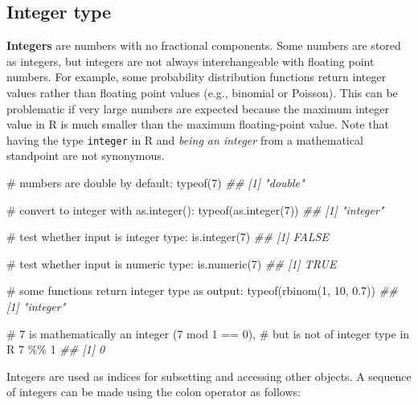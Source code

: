 \documentclass[
  13,
  letterpaper,
]{report}
\newenvironment{Shaded}{\begin{snugshade}}{\end{snugshade}}
\newcommand{\CommentTok}[1]{\textcolor[rgb]{0.37,0.37,0.37}{#1}}
\newcommand{\DecValTok}[1]{\textcolor[rgb]{0.68,0.00,0.00}{#1}}
\newcommand{\DocumentationTok}[1]{\textcolor[rgb]{0.37,0.37,0.37}{\textit{#1}}}
\newcommand{\FloatTok}[1]{\textcolor[rgb]{0.68,0.00,0.00}{#1}}
\newcommand{\FunctionTok}[1]{\textcolor[rgb]{0.28,0.35,0.67}{#1}}
\newcommand{\NormalTok}[1]{\textcolor[rgb]{0.00,0.23,0.31}{#1}}
\newcommand{\SpecialCharTok}[1]{\textcolor[rgb]{0.37,0.37,0.37}{#1}}
\begin{document}
\subsection{Integer type}\label{integer-type}

\textbf{Integers} are numbers with no fractional components. Some
numbers are stored as integers, but integers are not always
interchangeable with floating point numbers. For example, some
probability distribution functions return integer values rather than
floating point values (e.g., binomial or Poisson). This can be
problematic if very large numbers are expected because the maximum
integer value in R is much smaller than the maximum floating-point
value. Note that having the type \texttt{integer} in R and \emph{being
an integer} from a mathematical standpoint are not synonymous.

\begin{Shaded}
\begin{Highlighting}[]
\CommentTok{\# numbers are double by default:}
\FunctionTok{typeof}\NormalTok{(}\DecValTok{7}\NormalTok{)}
\DocumentationTok{\#\# [1] "double"}

\CommentTok{\# convert to integer with as.integer():}
\FunctionTok{typeof}\NormalTok{(}\FunctionTok{as.integer}\NormalTok{(}\DecValTok{7}\NormalTok{))}
\DocumentationTok{\#\# [1] "integer"}

\CommentTok{\# test whether input is integer type:}
\FunctionTok{is.integer}\NormalTok{(}\DecValTok{7}\NormalTok{)}
\DocumentationTok{\#\# [1] FALSE}

\CommentTok{\# test whether input is numeric type:}
\FunctionTok{is.numeric}\NormalTok{(}\DecValTok{7}\NormalTok{)}
\DocumentationTok{\#\# [1] TRUE}

\CommentTok{\# some functions return integer type as output:}
\FunctionTok{typeof}\NormalTok{(}\FunctionTok{rbinom}\NormalTok{(}\DecValTok{1}\NormalTok{, }\DecValTok{10}\NormalTok{, }\FloatTok{0.7}\NormalTok{))}
\DocumentationTok{\#\# [1] "integer"}

\CommentTok{\# 7 is mathematically an integer (7 mod 1 == 0),}
\CommentTok{\# but is not of integer type in R}
\DecValTok{7} \SpecialCharTok{\%\%} \DecValTok{1}
\DocumentationTok{\#\# [1] 0}
\end{Highlighting}
\end{Shaded}

Integers are used as indices for subsetting and accessing other objects.
A sequence of integers can be made using the colon operator as follows:
\end{document}
